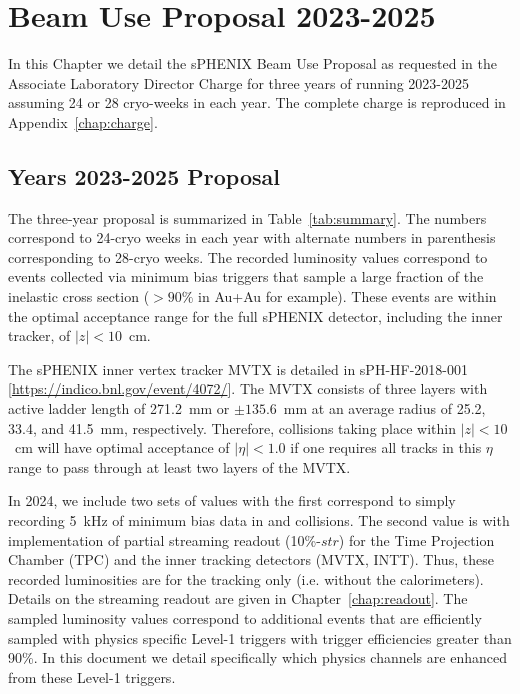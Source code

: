 \chapter{Beam Use Proposal 2023-2025}
\label{chap:beam_use_proposal}

In this Chapter we detail the sPHENIX Beam Use Proposal as requested in the Associate Laboratory Director Charge for three years of running 2023-2025 assuming 24 or 28 cryo-weeks in each year.  The complete charge is reproduced in Appendix~\ref{chap:charge}.   

\section{Years 2023-2025 Proposal}

The three-year proposal is summarized in Table~\ref{tab:summary}.   The numbers correspond to 24-cryo weeks in each year with alternate numbers in parenthesis corresponding to 28-cryo weeks.    The recorded luminosity values correspond to events collected via minimum bias triggers that sample a large fraction of the inelastic cross section ($> 90\%$ in Au+Au for example).    These events are within the optimal acceptance range for the full sPHENIX detector, including the inner tracker, of $|z|<10$~cm.    

The sPHENIX inner vertex tracker MVTX is detailed in sPH-HF-2018-001 [\url{https://indico.bnl.gov/event/4072/}].   The MVTX consists of three layers with active ladder length of 271.2~mm or $\pm135.6$~mm at an average radius of 25.2, 33.4, and 41.5~mm, respectively. Therefore, collisions taking place within $|z| < 10$~cm will have optimal acceptance of $|\eta| < 1.0$ if one requires all tracks in this $\eta$ range to pass through at least two layers of the MVTX.

In 2024, we include two sets of values with the first correspond to simply recording 5~kHz of minimum bias data in \pp and \pau collisions.   The second value is with implementation of partial streaming readout (10\%-$str$) for the Time Projection Chamber (TPC) and the inner tracking detectors (MVTX, INTT).    Thus, these recorded luminosities are for the tracking only (i.e. without the calorimeters).   Details on the streaming readout are given in Chapter~\ref{chap:readout}.
The sampled luminosity values correspond to additional events that are efficiently sampled with physics specific Level-1 triggers with trigger efficiencies greater than 90\%.    In this document we detail specifically which physics channels are enhanced from these Level-1 triggers.     

